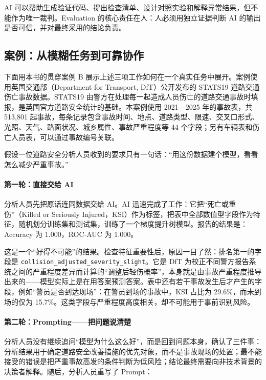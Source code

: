 AI 可以帮助生成验证代码、提出检查清单、设计对照实验和解释异常结果，但不能作为唯一裁判。Evaluation 的核心责任在人：人必须用独立证据判断 AI 的输出是否可信，并对最终采用的结论负责。

\subsection{案例：从模糊任务到可靠协作}

下面用本书的贯穿案例 B 展示上述三项工作如何在一个真实任务中展开。案例使用英国交通部（Department for Transport, DfT）公开发布的 STATS19 道路交通伤亡事故数据。STATS19 由警方在处理每一起造成人员伤亡的道路交通事故时填报，是英国官方道路安全统计的基础。本案例使用 2021—2025 年的事故表\cite{dft2026stats19}，共 513,801 起事故，每条记录包含事故时间、地点、道路类型、限速、交叉口形式、光照、天气、路面状况、城乡属性、事故严重程度等 44 个字段；另有车辆表和伤亡人员表，可以通过事故编号关联。

假设一位道路安全分析人员收到的要求只有一句话：“用这份数据建个模型，看看怎么减少严重事故。”

\paragraph{第一轮：直接交给 AI}

分析人员先把原话连同数据交给 AI。AI 迅速完成了工作：它把“死亡或重伤”（Killed or Seriously Injured，KSI）作为标签，把表中全部数值型字段作为特征，随机划分训练集和测试集，训练了一个梯度提升树模型。报告的结果是：Accuracy 为 1.000，ROC-AUC 为 1.000。

这是一个“好得不可能”的结果。检查特征重要性后，原因一目了然：排名第一的字段是 \texttt{collision\_adjusted\_severity\_slight}。它是 DfT 为校正不同警方报告系统之间的严重程度差异而计算的“调整后轻伤概率”，本身就是由事故严重程度推导出来的——模型实际上是在用答案预测答案。表中还有若干事故发生后才产生的字段，例如“警员是否到达现场”：在警员到场的事故中，KSI 占比为 29.6\%，而未到场的仅为 15.7\%。这类字段与严重程度高度相关，却不可能用于事前识别风险。

\paragraph{第二轮：Prompting——把问题说清楚}

分析人员没有继续追问“模型为什么这么好”，而是回到问题本身，确认了三件事：分析结果用于确定道路安全改善措施的优先对象，而不是事故现场的处置；最不能接受的错误是把严重事故高发的条件判断为低风险；结论最终需要向非技术背景的决策者解释。随后，分析人员重写了 Prompt：

